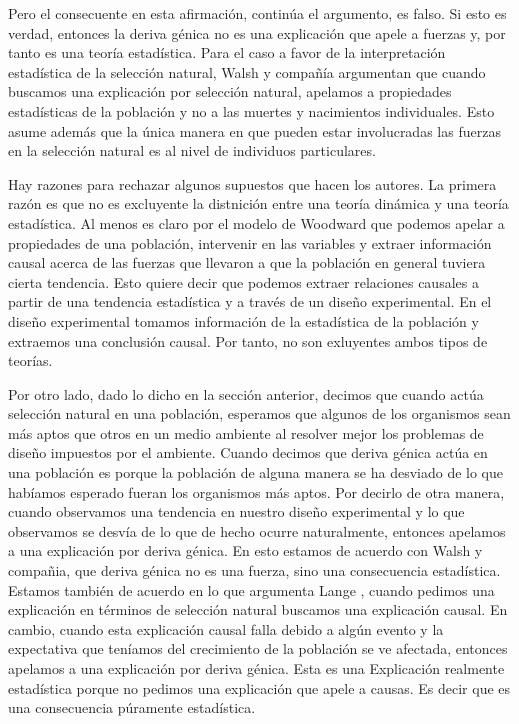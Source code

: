  Pero el consecuente en esta afirmación, continúa el argumento, es falso. Si esto es verdad, entonces la deriva génica no es una explicación que apele a fuerzas y, por tanto es una teoría estadística. Para el caso a favor de la interpretación estadística de la selección natural, Walsh y compañía argumentan que cuando buscamos una explicación por selección natural, apelamos a propiedades estadísticas de la población y no a las muertes y nacimientos individuales. Esto asume además que la única manera en que pueden estar involucradas las fuerzas en la selección natural es al nivel de individuos particulares.

 Hay razones para rechazar algunos supuestos que hacen los autores. La primera razón es que no es excluyente la distnición entre una teoría dinámica y una teoría estadística. Al menos es claro por el modelo de Woodward que podemos apelar a propiedades de una población, intervenir en las variables y extraer información causal acerca de las fuerzas que llevaron a que la población en general tuviera cierta tendencia. Esto quiere decir que podemos extraer relaciones causales a partir de una tendencia estadística y a través de un diseño experimental. En el diseño experimental tomamos información de la estadística de la población y extraemos una conclusión causal. Por tanto, no son exluyentes ambos tipos de teorías.

Por otro lado, dado lo dicho en la sección anterior, decimos que cuando actúa selección natural en una población, esperamos que algunos de los organismos sean más aptos que otros en un medio ambiente al resolver mejor los problemas de diseño impuestos por el ambiente. Cuando decimos que deriva génica actúa en una población es porque la población de alguna manera se ha desviado de lo que habíamos esperado fueran los organismos más aptos. Por decirlo de otra manera, cuando observamos una tendencia en nuestro diseño experimental y lo que observamos se desvía de lo que de hecho ocurre naturalmente, entonces apelamos a una explicación por deriva génica. En esto estamos de acuerdo con Walsh y compañia, que deriva génica no es una fuerza, sino una consecuencia estadística. Estamos también de acuerdo en lo que argumenta Lange \citeyear{Lange2013}, cuando pedimos una explicación en términos de selección natural buscamos una explicación causal. En cambio, cuando esta explicación causal falla debido a algún evento y la expectativa que teníamos del crecimiento de la población se ve afectada, entonces apelamos a una explicación por deriva génica. Esta es una Explicación realmente estadística porque no pedimos una explicación que apele a causas. Es decir que es una consecuencia púramente estadística.

